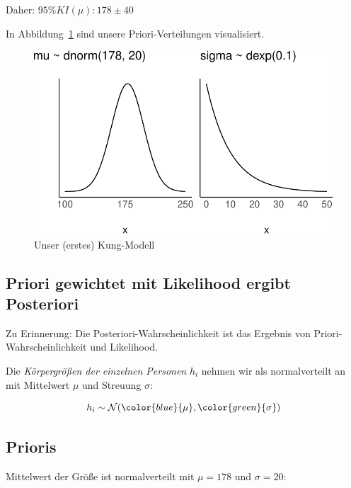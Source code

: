 \documentclass[
  a4paper,
  DIV=11]{scrreprt}
\theoremstyle{definition}
\theoremstyle{remark}
\begin{document}
Daher: \(95\%KI( \mu): 178 \pm 40\)

In Abbildung~\ref{fig-kung-model1} sind unsere Priori-Verteilungen
visualisiert.

\begin{figure}

{\centering \includegraphics{./gauss_files/figure-pdf/fig-kung-model1-1.pdf}

}

\caption{\label{fig-kung-model1}Unser (erstes) Kung-Modell}

\end{figure}

\hypertarget{priori-gewichtet-mit-likelihood-ergibt-posteriori}{%
\subsection{Priori gewichtet mit Likelihood ergibt
Posteriori}\label{priori-gewichtet-mit-likelihood-ergibt-posteriori}}

Zu Erinnerung: Die Posteriori-Wahrscheinlichkeit ist das Ergebnis von
Priori-Wahrscheinlichkeit und Likelihood.

Die \emph{Körpergrößen der einzelnen Personen} \(h_i\) nehmen wir als
normalverteilt an mit Mittelwert \(\mu\) und Streuung \(\sigma\):

\[h_i \sim \mathcal{N}(\color{blue}{\mu},\color{green}{\sigma})\]

\hypertarget{prioris}{%
\subsection{Prioris}\label{prioris}}

Mittelwert der Größe ist normalverteilt mit \(\mu=178\) und
\(\sigma=20\):
\end{document}
